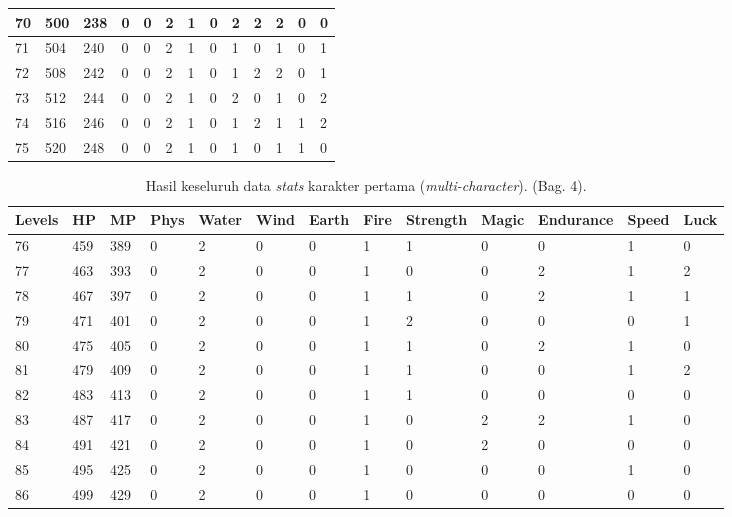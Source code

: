 \begin{sidewaystable}[!h]
\begin{tabular}{|l|l|l|l|l|l|l|l|l|l|l|l|l|}
		70 & 500 & 238 & 0 & 0 & 2 & 1 & 0 & 2 & 2 & 2 & 0 & 0 \\ \hline
		71 & 504 & 240 & 0 & 0 & 2 & 1 & 0 & 1 & 0 & 1 & 0 & 1 \\ \hline
		72 & 508 & 242 & 0 & 0 & 2 & 1 & 0 & 1 & 2 & 2 & 0 & 1 \\ \hline
		73 & 512 & 244 & 0 & 0 & 2 & 1 & 0 & 2 & 0 & 1 & 0 & 2 \\ \hline
		74 & 516 & 246 & 0 & 0 & 2 & 1 & 0 & 1 & 2 & 1 & 1 & 2 \\ \hline
		75 & 520 & 248 & 0 & 0 & 2 & 1 & 0 & 1 & 0 & 1 & 1 & 0 \\ \hline
	\end{tabular}
\end{sidewaystable}
\clearpage


\begin{sidewaystable}[!h]
	\centering
	\caption{Hasil keseluruh data \textit{stats} karakter pertama (\textit{multi-character}). (Bag. 4).}
	\label{tb:player_all_stats_4_1}
	\vspace{1ex}
	\begin{tabular}{|l|l|l|l|l|l|l|l|l|l|l|l|l|}
		\hline
		\rowcolor[HTML]{C0C0C0} 
		\textbf{Levels} & \textbf{HP} & \textbf{MP} & \textbf{Phys} & \textbf{Water} & \textbf{Wind} & \textbf{Earth} & \textbf{Fire} & \textbf{Strength} & \textbf{Magic} & \textbf{Endurance} & \textbf{Speed} & \textbf{Luck} \\ \hline	
		76 & 459 & 389 & 0 & 2 & 0 & 0 & 1 & 1 & 0 & 0 & 1 & 0 \\ \hline
		77 & 463 & 393 & 0 & 2 & 0 & 0 & 1 & 0 & 0 & 2 & 1 & 2 \\ \hline
		78 & 467 & 397 & 0 & 2 & 0 & 0 & 1 & 1 & 0 & 2 & 1 & 1 \\ \hline
		79 & 471 & 401 & 0 & 2 & 0 & 0 & 1 & 2 & 0 & 0 & 0 & 1 \\ \hline
		80 & 475 & 405 & 0 & 2 & 0 & 0 & 1 & 1 & 0 & 2 & 1 & 0 \\ \hline
		81 & 479 & 409 & 0 & 2 & 0 & 0 & 1 & 1 & 0 & 0 & 1 & 2 \\ \hline
		82 & 483 & 413 & 0 & 2 & 0 & 0 & 1 & 1 & 0 & 0 & 0 & 0 \\ \hline
		83 & 487 & 417 & 0 & 2 & 0 & 0 & 1 & 0 & 2 & 2 & 1 & 0 \\ \hline
		84 & 491 & 421 & 0 & 2 & 0 & 0 & 1 & 0 & 2 & 0 & 0 & 0 \\ \hline
		85 & 495 & 425 & 0 & 2 & 0 & 0 & 1 & 0 & 0 & 0 & 1 & 0 \\ \hline
		86 & 499 & 429 & 0 & 2 & 0 & 0 & 1 & 0 & 0 & 0 & 0 & 0 \\ \hline

\end{tabular}
\end{sidewaystable}
